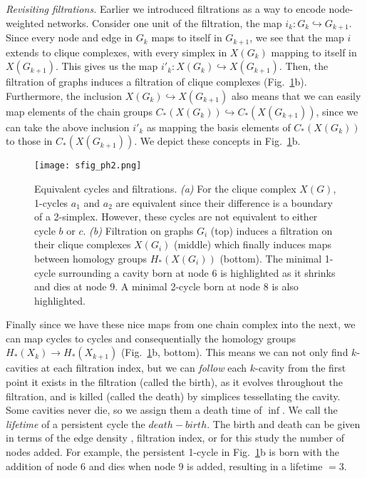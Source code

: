 \documentclass{article}
\begin{document}
\noindent\emph{Revisiting filtrations.} Earlier we introduced filtrations as a way to encode node-weighted networks. Consider one unit of the filtration, the map $i_k:G_k \hookrightarrow G_{k+1}$. Since every node and edge in $G_k$ maps to itself in $G_{k+1}$, we see that the map $i$ extends to clique complexes, with every simplex in $X(G_k)$ mapping to itself in $X(G_{k+1})$.  This gives us the map $i'_k: X(G_k) \hookrightarrow X(G_{k+1})$. Then, the filtration of graphs induces a filtration of clique complexes (Fig.~\ref{fig:sfig_ph2}b). Furthermore, the inclusion $X(G_k) \hookrightarrow X(G_{k+1})$ also means that we can easily map elements of the chain groups $C_*(X(G_k)) \hookrightarrow C_*(X(G_{k+1}))$, since we can take the above inclusion $i'_k$ as mapping the basis elements of $C_*(X(G_k))$ to those in $C_*(X(G_{k+1}))$. We depict these concepts in Fig.~\ref{fig:sfig_ph2}b.

\begin{figure}
	\centering
	\texttt{[image: sfig\_ph2.png]}
	\caption{Equivalent cycles and filtrations. \emph{(a)} For the clique complex $X(G)$, 1-cycles $a_1$ and $a_2$ are equivalent since their difference is a boundary of a 2-simplex. However, these cycles are not equivalent to either cycle $b$ or $c$. \emph{(b)} Filtration on graphs $G_i$ (top) induces a filtration on their clique complexes $X(G_i)$ (middle) which finally induces maps between homology groups $H_*(X(G_i))$ (bottom). The minimal 1-cycle surrounding a cavity born at node 6 is highlighted as it shrinks and dies at node 9. A minimal 2-cycle born at node 8 is also highlighted.}
	\label{fig:sfig_ph2}
\end{figure}

Finally since we have these nice maps from one chain complex into the next, we can map cycles to cycles and consequentially the homology groups $H_*(X_k) \rightarrow H_*(X_{k+1})$ (Fig.~\ref{fig:sfig_ph2}b, bottom). This means we can not only find $k$-cavities at each filtration index, but we can \emph{follow} each $k$-cavity from the first point it exists in the filtration (called the birth), as it evolves throughout the filtration, and is killed (called the death) by simplices tessellating the cavity. Some cavities never die, so we assign them a death time of $\inf$. We call the \emph{lifetime} of a persistent cycle the $death - birth$. The birth and death can be given in terms of the edge density \cite{giusti2015clique,sizemore2016classification}, filtration index, or for this study the number of nodes added. For example, the persistent 1-cycle in Fig.~\ref{fig:sfig_ph2}b is born with the addition of node 6 and dies when node 9 is added, resulting in a lifetime $=3$.
\end{document}

